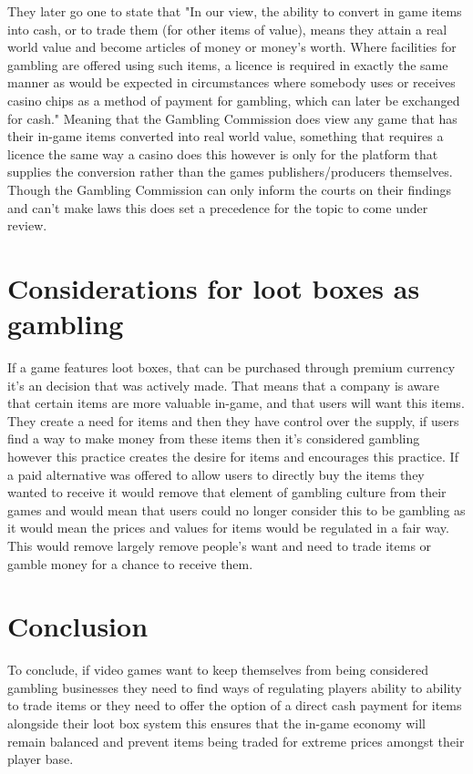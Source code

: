 \documentclass{scrartcl}
\begin{document}
They later go one to state that "In our view, the ability to convert in game items into cash, or to trade them (for other items of value), means they attain a real world value and become articles of money or money’s worth. Where facilities for gambling are offered using such items, a licence is required in exactly the same manner as would be expected in circumstances where somebody uses or receives casino chips as a method of payment for gambling, which can later be exchanged for cash." Meaning that the Gambling Commission does view any game that has their in-game items converted into real world value, something that requires a licence the same way a casino does this however is only for the platform that supplies the conversion rather than the games publishers/producers themselves. Though the Gambling Commission can only inform the courts on their findings and can't make laws this does set a precedence for the topic to come under review.

\section{Considerations for loot boxes as gambling}
If a game features loot boxes, that can be purchased through premium currency it's an decision that was actively made. That means that a company is aware that certain items are more valuable in-game, and that users will want this items. They create a need for items and then they have control over the supply, if users find a way to make money from these items then it's considered gambling however this practice creates the desire for items and encourages this practice. If a paid alternative was offered to allow users to directly buy the items they wanted to receive it would remove that element of gambling culture from their games and would mean that users could no longer consider this to be gambling as it would mean the prices and values for items would be regulated in a fair way. This would remove largely remove people's want and need to trade items or gamble money for a chance to receive them.

\section{Conclusion}
To conclude, if video games want to keep themselves from being considered gambling businesses they need to find ways of regulating players ability to ability to trade items or they need to offer the option of a direct cash payment for items alongside their loot box system this ensures that the in-game economy will remain balanced and prevent items being traded for extreme prices amongst their player base.



\end{document}
